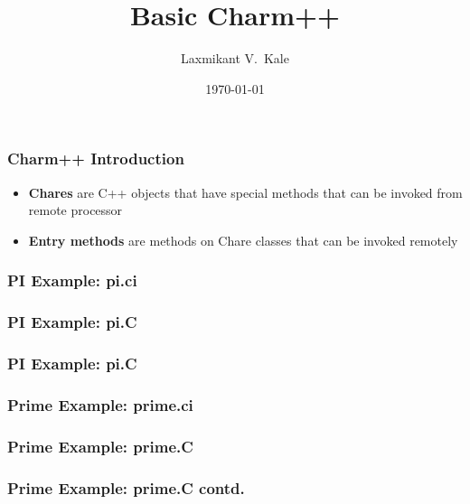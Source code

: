 \documentclass{beamer}
\title{Basic Charm++}
\author[Laxmikant V.~Kale]{
Laxmikant V.~Kale
}
\date{\today}
\begin{document}
\begin{frame}[fragile]
  \frametitle{Charm++ Introduction}
    \begin{itemize}
    \item \textbf{Chares} are C++ objects that have special methods that can be invoked
    from remote processor
    \item \textbf{Entry methods} are methods on Chare classes that can be invoked
    remotely
    \end{itemize}
\end{frame}



\begin{frame}[fragile]
  \frametitle{PI Example: pi.ci}
  
\end{frame}

\begin{frame}[fragile]
  \frametitle{PI Example: pi.C}
  
\end{frame}

\begin{frame}[fragile]
  \frametitle{PI Example: pi.C}
  
\end{frame}

\begin{frame}[fragile]
  \frametitle{Prime Example: prime.ci}
  
\end{frame}

\begin{frame}[fragile]
  \frametitle{Prime Example: prime.C}
  
\end{frame}

\begin{frame}[fragile]
  \frametitle{Prime Example: prime.C contd.}
  
\end{frame}


\end{document}
